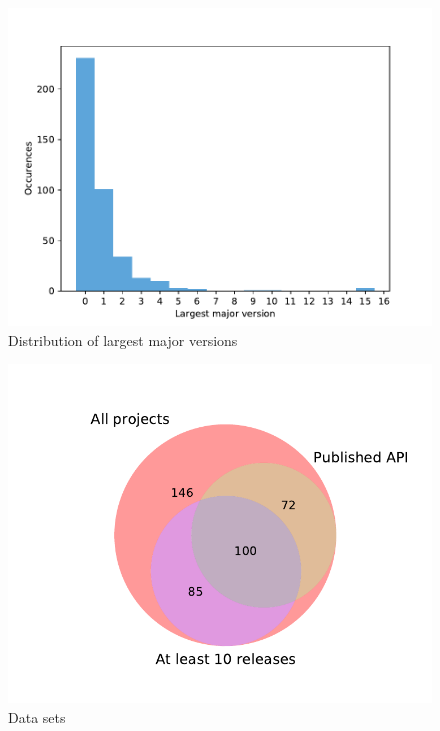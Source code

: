 \documentclass{l4proj}
\begin{document}
\begin{appendices}
\begin{figure}[]
\caption{Distribution of largest major versions}
\label{DistributionLargestMajor}
\centering
\includegraphics[height=0.4\textheight]
{images/evaluation/distribution_major_versions}
\end{figure}

\begin{figure}[]
\centering
\caption{Data sets}
\label{Datasets}
\includegraphics[height=0.4\textheight]
{images/evaluation/datasets}
\end{figure}


\end{appendices}
\end{document}
